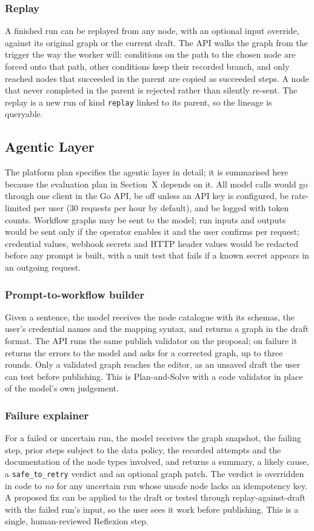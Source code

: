 \documentclass[conference]{IEEEtran}
\begin{document}
\subsubsection{Replay}
A finished run can be replayed from any node, with an optional input override, against its original graph or the current draft. The API walks the graph from the trigger the way the worker will: conditions on the path to the chosen node are forced onto that path, other conditions keep their recorded branch, and only reached nodes that succeeded in the parent are copied as succeeded steps. A node that never completed in the parent is rejected rather than silently re-sent. The replay is a new run of kind \texttt{replay} linked to its parent, so the lineage is queryable.

\subsection{Agentic Layer}
The platform plan specifies the agentic layer in detail; it is summarised here because the evaluation plan in Section~X depends on it. All model calls would go through one client in the Go API, be off unless an API key is configured, be rate-limited per user (30 requests per hour by default), and be logged with token counts. Workflow graphs may be sent to the model; run inputs and outputs would be sent only if the operator enables it and the user confirms per request; credential values, webhook secrets and HTTP header values would be redacted before any prompt is built, with a unit test that fails if a known secret appears in an outgoing request.

\subsubsection{Prompt-to-workflow builder}
Given a sentence, the model receives the node catalogue with its schemas, the user's credential names and the mapping syntax, and returns a graph in the draft format. The API runs the same publish validator on the proposal; on failure it returns the errors to the model and asks for a corrected graph, up to three rounds. Only a validated graph reaches the editor, as an unsaved draft the user can test before publishing. This is Plan-and-Solve with a code validator in place of the model's own judgement.

\subsubsection{Failure explainer}
For a failed or uncertain run, the model receives the graph snapshot, the failing step, prior steps subject to the data policy, the recorded attempts and the documentation of the node types involved, and returns a summary, a likely cause, a \texttt{safe\_to\_retry} verdict and an optional graph patch. The verdict is overridden in code to \emph{no} for any uncertain run whose unsafe node lacks an idempotency key. A proposed fix can be applied to the draft or tested through replay-against-draft with the failed run's input, so the user sees it work before publishing. This is a single, human-reviewed Reflexion step.
\end{document}
